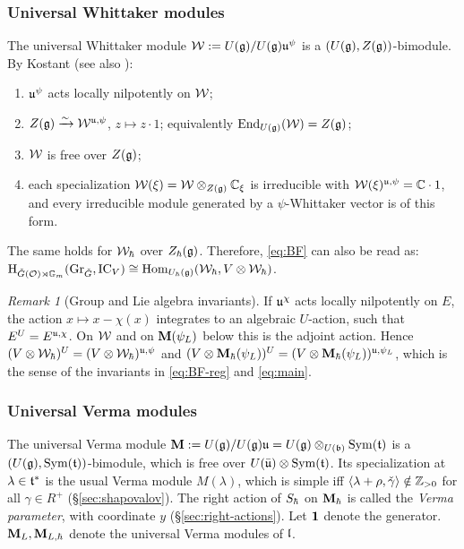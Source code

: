 \documentclass{article}
\theoremstyle{plain}
\theoremstyle{definition}
\theoremstyle{remark}
\newtheorem{remark}[theorem]{Remark}
\numberwithin{equation}{section}
\begin{document}
\subsubsection{Universal Whittaker modules}\label{sec:whittaker}
The universal Whittaker module $\mathcal{W}:=U(\mathfrak{g})/U(\mathfrak{g})\mathfrak{u}^{\psi}$ is a $(U(\mathfrak{g}),Z(\mathfrak{g}))$-bimodule. By Kostant \cite{Kostant1978} (see also \cite[\S4.2]{bezrukavnikov2026equivariantsatakecategorykostantwhittaker}):
\begin{enumerate}[label=(\roman*)]
\item $\mathfrak{u}^\psi$ acts locally nilpotently on $\mathcal{W}$;
\item $Z(\mathfrak{g})\xrightarrow{\sim}\mathcal{W}^{\mathfrak{u},\psi}$, $z\mapsto z\cdot1$; equivalently $\operatorname{End}_{U(\mathfrak{g})}(\mathcal{W})=Z(\mathfrak{g})$;
\item $\mathcal{W}$ is free over $Z(\mathfrak{g})$;
\item each specialization $\mathcal{W}(\xi)=\mathcal{W}\otimes_{Z(\mathfrak{g})}\mathbb{C}_\xi$ is irreducible with $\mathcal{W}(\xi)^{\mathfrak{u},\psi}=\mathbb{C}\cdot1$, and every irreducible module generated by a $\psi$-Whittaker vector is of this form.
\end{enumerate}
The same holds for $\mathcal{W}_\hbar$ over $Z_\hbar(\mathfrak{g})$. Therefore, \eqref{eq:BF} can also be read as: $\mathrm{H}_{{\check{G}}(\mathcal{O})\rtimes\mathbb{G}_m}(\operatorname{Gr}_{{\check{G}}},\operatorname{IC}_V)\cong\operatorname{Hom}_{U_\hbar(\mathfrak{g})}(\mathcal{W}_\hbar,V\otimes\mathcal{W}_\hbar)$.

\begin{remark}[Group and Lie algebra invariants]\label{rem:U-inv}
If $\mathfrak{u}^\chi$ acts locally nilpotently on $E$, the action $x\mapsto x-\chi(x)$ integrates to an algebraic $U$-action, such that $E^U=E^{\mathfrak{u},\chi}$. On $\mathcal{W}$ and on $\mathbf{M}(\psi_L)$ below this is the adjoint action. Hence $(V\otimes\mathcal{W}_\hbar)^{U}=(V\otimes\mathcal{W}_\hbar)^{\mathfrak{u},\psi}$ and $(V\otimes\mathbf{M}_\hbar(\psi_L))^U=(V\otimes\mathbf{M}_\hbar(\psi_L))^{\mathfrak{u},\psi_L}$, which is the sense of the invariants in \eqref{eq:BF-reg} and \eqref{eq:main}.
\end{remark}

\subsubsection{Universal Verma modules}\label{sec:verma}
The universal Verma module $\mathbf{M}:=U(\mathfrak{g})/U(\mathfrak{g})\mathfrak{u}=U(\mathfrak{g})\otimes_{U(\mathfrak{b})}\operatorname{Sym}(\mathfrak{t})$ is a $(U(\mathfrak{g}),\operatorname{Sym}(\mathfrak{t}))$-bimodule, which is free over $U(\bar{\mathfrak{u}})\otimes\operatorname{Sym}(\mathfrak{t})$. Its specialization at $\lambda\in\mathfrak{t}^*$ is the usual Verma module $M(\lambda)$, which is simple iff $\langle\lambda+\rho,\check\gamma\rangle\notin\mathbb{Z}_{>0}$ for all $\gamma\in R^+$ (\S\ref{sec:shapovalov}). The right action of $S_\hbar$ on $\mathbf{M}_\hbar$ is called the \emph{Verma parameter}, with coordinate $y$ (\S\ref{sec:right-actions}). Let $\mathbf 1$ denote the generator. $\mathbf{M}_L,\mathbf{M}_{L,\hbar}$ denote the universal Verma modules of $\mathfrak{l}$.
\end{document}
